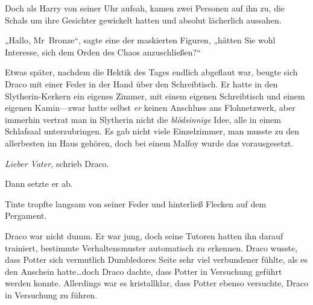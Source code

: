 Doch als Harry von seiner Uhr aufsah, kamen zwei Personen auf ihn zu, die Schals um ihre Gesichter gewickelt hatten und absolut lächerlich aussahen.

„Hallo, Mr~Bronze“, sagte eine der maskierten Figuren, „hätten Sie wohl Interesse, sich dem Orden des Chaos anzuschließen?“


Etwas später, nachdem die Hektik des Tages endlich abgeflaut war, beugte sich Draco mit einer Feder in der Hand über den Schreibtisch. Er hatte in den Slytherin-Kerkern ein eigenes Zimmer, mit einem eigenen Schreibtisch und einem eigenen Kamin—zwar hatte selbst \emph{er} keinen Anschluss ans Flohnetzwerk, aber immerhin vertrat man in Slytherin nicht die \emph{blödsinnige} Idee, alle in einem Schlafsaal unterzubringen. Es gab nicht viele Einzelzimmer, man musste zu den allerbesten im Haus gehören, doch bei einem Malfoy wurde das vorausgesetzt.

\emph{Lieber Vater,} schrieb Draco.

Dann setzte er ab.

Tinte tropfte langsam von seiner Feder und hinterließ Flecken auf dem Pergament.

Draco war nicht dumm. Er war jung, doch seine Tutoren hatten ihn darauf trainiert, bestimmte Verhaltensmuster automatisch zu erkennen. Draco wusste, dass Potter sich vermutlich Dumbledores Seite sehr viel verbundener fühlte, als es den Anschein hatte…doch Draco dachte, dass Potter in Versuchung geführt werden konnte. Allerdings war es kristallklar, dass Potter ebenso versuchte, Draco in Versuchung zu führen.

